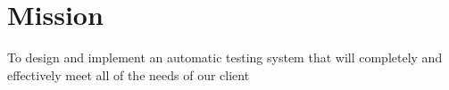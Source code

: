 
\chapter{Mission}

To design and implement an automatic testing system that will completely and effectively meet all of the needs of our client